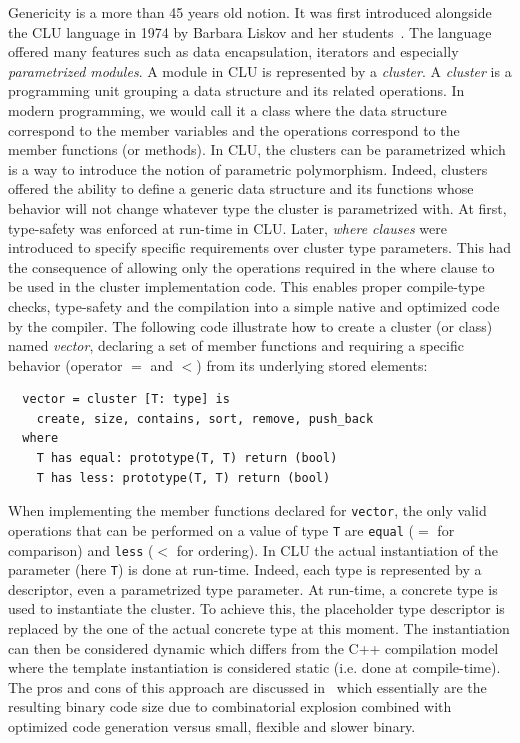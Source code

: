 Genericity is a more than 45 years old notion. It was first introduced alongside the CLU language in 1974 by Barbara
Liskov and her students~\parencite{liskov.1993.cluart}. The language offered many features such as data encapsulation,
iterators and especially \emph{parametrized modules}. A module in CLU is represented by a \emph{cluster}. A
\emph{cluster} is a programming unit grouping a data structure and its related operations. In modern programming, we
would call it a class where the data structure correspond to the member variables and the operations correspond to the
member functions (or methods). In CLU, the clusters can be parametrized which is a way to introduce the notion of
parametric polymorphism. Indeed, clusters offered the ability to define a generic data structure and its functions whose
behavior will not change whatever type the cluster is parametrized with. At first, type-safety was enforced at run-time
in CLU. Later, \emph{where clauses} were introduced to specify specific requirements over cluster type parameters. This
had the consequence of allowing only the operations required in the where clause to be used in the cluster
implementation code. This enables proper compile-type checks, type-safety and the compilation into a simple native and
optimized code by the compiler. The following code illustrate how to create a cluster (or class) named \emph{vector},
declaring a set of member functions and requiring a specific behavior (operator $=$ and $<$) from its underlying stored
elements:

\begin{verbatim}
  vector = cluster [T: type] is
    create, size, contains, sort, remove, push_back
  where
    T has equal: prototype(T, T) return (bool)
    T has less: prototype(T, T) return (bool)
\end{verbatim}

When implementing the member functions declared for \texttt{vector}, the only valid operations that can be performed on
a value of type \texttt{T} are \texttt{equal} ($=$ for comparison) and \texttt{less} ($<$ for ordering). In CLU the
actual instantiation of the parameter (here \texttt{T}) is done at run-time. Indeed, each type is represented by a
descriptor, even a parametrized type parameter. At run-time, a concrete type is used to instantiate the cluster. To
achieve this, the placeholder type descriptor is replaced by the one of the actual concrete type at this moment. The
instantiation can then be considered dynamic which differs from the C++ compilation model where the template
instantiation is considered static (i.e. done at compile-time). The pros and cons of this approach are discussed
in~\parencite{atkinson.1978.cluimpl} which essentially are the resulting binary code size due to combinatorial explosion
combined with optimized code generation versus small, flexible and slower binary.

